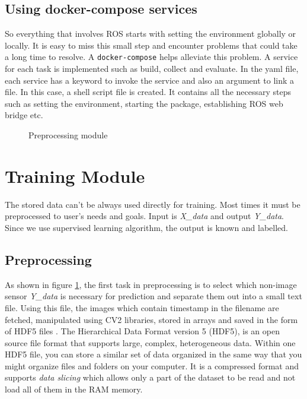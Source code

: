 \subsection{Using docker-compose services}
So everything that involves ROS starts with setting the environment globally or locally.
It is easy to miss this small step and encounter problems that could take a long time to
resolve. A \texttt{docker-compose} helps alleviate this problem. A service for each task
is implemented such as build, collect and evaluate. In the yaml file, each service has a
keyword to invoke the service and also an argument to link a file. In this case, a
shell script file is created. It contains all the necessary steps
such as setting the environment, starting the package, establishing ROS web bridge etc.
\fi

\begin{figure}
	\centering
    \def\svgwidth{0.5\textwidth}
    \caption{Preprocessing module}
    \label{fig:preprocessing}
\end{figure}

\section{Training Module}

The stored data can't be always used directly for training. Most times it must be
preprocessed to user's needs and goals. Input is \textit{X\_{data}} and output
\textit{Y\_{data}}. Since we use supervised learning algorithm, the output is known and
labelled.

\subsection{Preprocessing}
As shown in figure \ref{fig:preprocessing}, the first task in preprocessing is to select which non-image sensor \textit{Y\_{data}} is necessary for prediction
and separate them out into a small text file. Using this file, the images which contain
timestamp in the filename are fetched, manipulated using CV2 libraries, stored in arrays and saved in the form of HDF5 files
\cite{hdf5file}. The Hierarchical Data Format version 5 (HDF5), is an open source file format
that supports large, complex, heterogeneous data. Within one HDF5 file, you can store a similar set of data organized in the same way that you might organize files and folders on your computer.
It is a compressed format and supports \textit{data slicing} which allows only a part of
the dataset to be read and not load all of them in the RAM memory.

